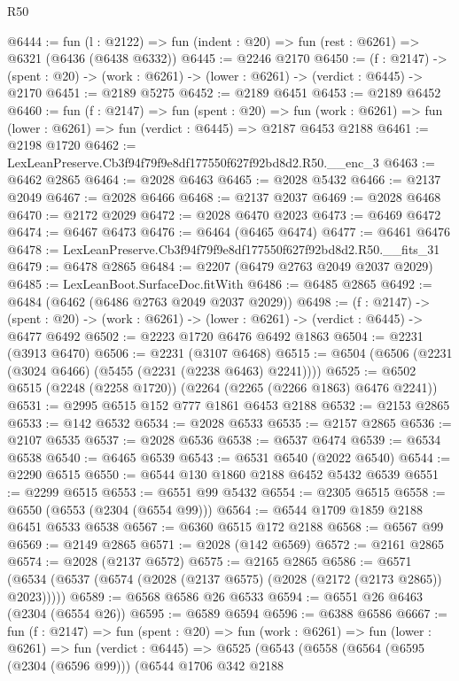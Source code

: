 \begin{lexlean}{R50}
\begin{coremodule}
@6444 := fun (l : @2122) => fun (indent : @20) => fun (rest : @6261) => @6321 (@6436 (@6438 @6332))
@6445 := @2246 @2170
@6450 := (f : @2147) ->
  (spent : @20) -> (work : @6261) -> (lower : @6261) -> (verdict : @6445) -> @2170
@6451 := @2189 @5275
@6452 := @2189 @6451
@6453 := @2189 @6452
@6460 := fun (f : @2147) =>
  fun (spent : @20) =>
  fun (work : @6261) => fun (lower : @6261) => fun (verdict : @6445) => @2187 @6453 @2188
@6461 := @2198 @1720
@6462 := LexLeanPreserve.Cb3f94f79f9e8df177550f627f92bd8d2.R50.__enc_3
@6463 := @6462 @2865
@6464 := @2028 @6463
@6465 := @2028 @5432
@6466 := @2137 @2049
@6467 := @2028 @6466
@6468 := @2137 @2037
@6469 := @2028 @6468
@6470 := @2172 @2029
@6472 := @2028 @6470 @2023
@6473 := @6469 @6472
@6474 := @6467 @6473
@6476 := @6464 (@6465 @6474)
@6477 := @6461 @6476
@6478 := LexLeanPreserve.Cb3f94f79f9e8df177550f627f92bd8d2.R50.__fits_31
@6479 := @6478 @2865
@6484 := @2207 (@6479 @2763 @2049 @2037 @2029)
@6485 := LexLeanBoot.SurfaceDoc.fitWith
@6486 := @6485 @2865
@6492 := @6484 (@6462 (@6486 @2763 @2049 @2037 @2029))
@6498 := (f : @2147) ->
  (spent : @20) -> (work : @6261) -> (lower : @6261) -> (verdict : @6445) -> @6477 @6492
@6502 := @2223 @1720 @6476 @6492 @1863
@6504 := @2231 (@3913 @6470)
@6506 := @2231 (@3107 @6468)
@6515 := @6504 (@6506 (@2231 (@3024 @6466) (@5455 (@2231 (@2238 @6463) @2241))))
@6525 := @6502 @6515 (@2248 (@2258 @1720)) (@2264 (@2265 (@2266 @1863) @6476 @2241))
@6531 := @2995 @6515 @152 @777 @1861 @6453 @2188
@6532 := @2153 @2865
@6533 := @142 @6532
@6534 := @2028 @6533
@6535 := @2157 @2865
@6536 := @2107 @6535
@6537 := @2028 @6536
@6538 := @6537 @6474
@6539 := @6534 @6538
@6540 := @6465 @6539
@6543 := @6531 @6540 (@2022 @6540)
@6544 := @2290 @6515
@6550 := @6544 @130 @1860 @2188 @6452 @5432 @6539
@6551 := @2299 @6515
@6553 := @6551 @99 @5432
@6554 := @2305 @6515
@6558 := @6550 (@6553 (@2304 (@6554 @99)))
@6564 := @6544 @1709 @1859 @2188 @6451 @6533 @6538
@6567 := @6360 @6515 @172 @2188
@6568 := @6567 @99
@6569 := @2149 @2865
@6571 := @2028 (@142 @6569)
@6572 := @2161 @2865
@6574 := @2028 (@2137 @6572)
@6575 := @2165 @2865
@6586 := @6571 (@6534 (@6537 (@6574 (@2028 (@2137 @6575) (@2028 (@2172 (@2173 @2865)) @2023)))))
@6589 := @6568 @6586 @26 @6533
@6594 := @6551 @26 @6463 (@2304 (@6554 @26))
@6595 := @6589 @6594
@6596 := @6388 @6586
@6667 := fun (f : @2147) =>
  fun (spent : @20) =>
  fun (work : @6261) =>
  fun (lower : @6261) =>
  fun (verdict : @6445) =>
  @6525
    (@6543
      (@6558
        (@6564
          (@6595 (@2304 (@6596 @99)))
          (@6544
            @1706
            @342
            @2188

\end{coremodule}
\end{lexlean}
